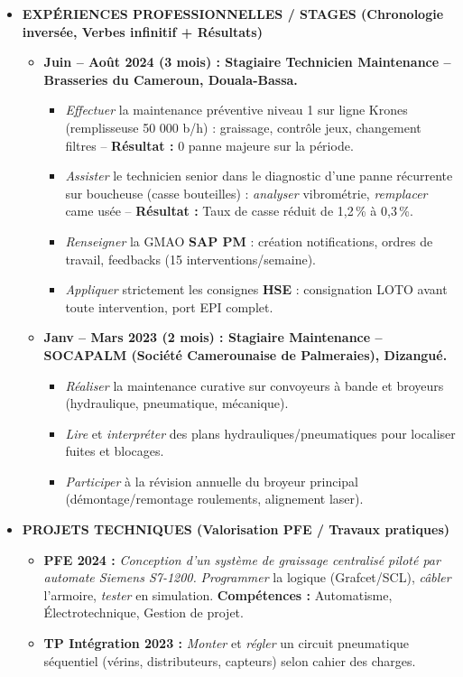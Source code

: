 \documentclass[11pt]{article}
\begin{document}
\begin{exoresolu}
\begin{itemize}
    \item \textbf{EXPÉRIENCES PROFESSIONNELLES / STAGES (Chronologie inversée, Verbes infinitif + Résultats)}
    \begin{itemize}
        \item \textbf{Juin -- Août 2024 (3 mois) : Stagiaire Technicien Maintenance -- Brasseries du Cameroun, Douala-Bassa.}
        \begin{itemize}
            \item \emph{Effectuer} la maintenance préventive niveau 1 sur ligne Krones (remplisseuse 50 000 b/h) : graissage, contrôle jeux, changement filtres -- \textbf{Résultat :} 0 panne majeure sur la période.
            \item \emph{Assister} le technicien senior dans le diagnostic d'une panne récurrente sur boucheuse (casse bouteilles) : \emph{analyser} vibrométrie, \emph{remplacer} came usée -- \textbf{Résultat :} Taux de casse réduit de 1,2\,\% à 0,3\,\%.
            \item \emph{Renseigner} la GMAO \textbf{SAP PM} : création notifications, ordres de travail, feedbacks (15 interventions/semaine).
            \item \emph{Appliquer} strictement les consignes \textbf{HSE} : consignation LOTO avant toute intervention, port EPI complet.
        \end{itemize}
        \item \textbf{Janv -- Mars 2023 (2 mois) : Stagiaire Maintenance -- SOCAPALM (Société Camerounaise de Palmeraies), Dizangué.}
        \begin{itemize}
            \item \emph{Réaliser} la maintenance curative sur convoyeurs à bande et broyeurs (hydraulique, pneumatique, mécanique).
            \item \emph{Lire} et \emph{interpréter} des plans hydrauliques/pneumatiques pour localiser fuites et blocages.
            \item \emph{Participer} à la révision annuelle du broyeur principal (démontage/remontage roulements, alignement laser).
        \end{itemize}
    \end{itemize}
    
    \item \textbf{PROJETS TECHNIQUES (Valorisation PFE / Travaux pratiques)}
    \begin{itemize}
        \item \textbf{PFE 2024 :} \emph{Conception d'un système de graissage centralisé piloté par automate Siemens S7-1200.} \emph{Programmer} la logique (Grafcet/SCL), \emph{câbler} l'armoire, \emph{tester} en simulation. \textbf{Compétences :} Automatisme, Électrotechnique, Gestion de projet.
        \item \textbf{TP Intégration 2023 :} \emph{Monter} et \emph{régler} un circuit pneumatique séquentiel (vérins, distributeurs, capteurs) selon cahier des charges.
    \end{itemize}
    

\end{itemize}
\end{exoresolu}
\end{document}
